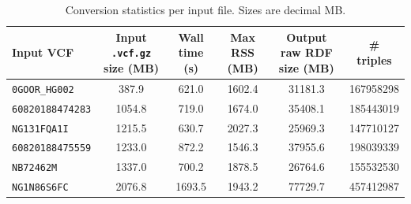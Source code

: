 \begin{table}[t]
\centering
\small
\setlength{\tabcolsep}{0pt}
\begin{tabular*}{\textwidth}{@{\extracolsep{\fill}}p{}
S[table-format=6.1]
S[table-format=6.1]
S[table-format=7.1]
S[table-format=7.1]
S[table-format=10.0]@{}}
\toprule
\textbf{Input VCF} &
{\textbf{Input \texttt{.vcf.gz} size (MB)}} &
{\textbf{Wall time (s)}} &
{\textbf{Max RSS (MB)}} &
{\textbf{Output raw RDF size (MB)}} &
{\textbf{\# triples}} \\
\midrule
\texttt{0GOOR\_HG002} & 387.9 & 621.0 & 1602.4 & 31181.3 & 167958298 \\
\texttt{60820188474283} & 1054.8 & 719.0 & 1674.0 & 35408.1 & 185443019 \\
\texttt{NG131FQA1I} & 1215.5 & 630.7 & 2027.3 & 25969.3 & 147710127 \\
\texttt{60820188475559} & 1233.0 & 872.2 & 1546.3 & 37955.6 & 198039339 \\
\texttt{NB72462M} & 1337.0 & 700.2 & 1878.5 & 26764.6 & 155532530 \\
\texttt{NG1N86S6FC} & 2076.8 & 1693.5 & 1943.2 & 77729.7 & 457412987 \\
\bottomrule
\end{tabular*}
\caption{Conversion statistics per input file. Sizes are decimal MB.}
\label{tab:conversion-stats}
\end{table}
